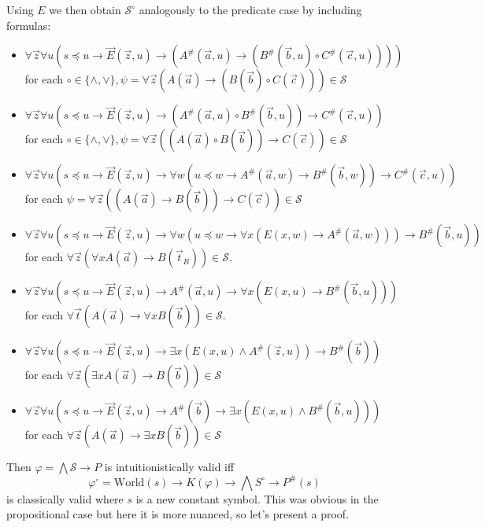 \documentclass[a4paper,12pt]{report}
\theoremstyle{definition}
\theoremstyle{definition}
\theoremstyle{definition}
\theoremstyle{definition}
\theoremstyle{definition}
\theoremstyle{definition}
\theoremstyle{definition}
\begin{document}
	Using $E$ we then obtain $\mathcal S^\circ$ analogously to the predicate case by including formulas:
	
	\begin{itemize}
		\item $\forall \vec z\forall u(s\preceq u\to \vec E(\vec z, u)\to (A^\#(\vec a, u)\to (B^\#(\vec b, u)\circ C^\#(\vec c, u))))$\\for each $\circ\in\{\wedge, \vee\}, \psi = \forall \vec z(A(\vec a)\to (B(\vec b)\circ C(\vec c)))\in\mathcal S$
		\item $\forall \vec z\forall u(s\preceq u\to\vec E(\vec z, u)\to (A^\#(\vec a, u)\circ B^\#(\vec b, u))\to C^\#(\vec c, u))$\\for each $\circ\in\{\wedge, \vee\}, \psi = \forall \vec z((A(\vec a)\circ B(\vec b))\to C(\vec c))\in\mathcal S$
		\item $\forall \vec z\forall u(s\preceq u\to\vec E(\vec z, u)\to\forall w(u\preceq w\to A^\#(\vec a, w)\to B^\#(\vec b, w))\to C^\#(\vec c, u))$\\ for each $\psi = \forall \vec z((A(\vec a)\to B(\vec b))\to C(\vec c))\in\mathcal S$
		\item  $\forall \vec z\forall u(s\preceq u\to\vec E(\vec z, u)\to \forall w(u\preceq w\to \forall x(E(x, w)\to A^\#(\vec a, w)))\to B^\#(\vec b, u))$\\for each $\forall \vec z(\forall xA(\vec a)\to B(\vec t_B))\in\mathcal S$.
		\item $\forall \vec z\forall u(s\preceq u\to\vec E(\vec z, u)\to A^\#(\vec a, u)\to \forall x(E(x, u)\to B^\#(\vec b, u)))$\\for each $\forall \vec t(A(\vec a)\to \forall xB(\vec b))\in\mathcal S$.
		\item $\forall \vec z\forall u(s\preceq u\to\vec E(\vec z, u)\to \exists x(E(x, u)\wedge A^\#(\vec z, u))\to B^\#(\vec b))$\\for each $\forall \vec z(\exists xA(\vec a)\to B(\vec b))\in\mathcal S$
		\item $\forall \vec z\forall u(s\preceq u\to\vec E(\vec z, u)\to A^\#(\vec b)\to \exists x(E(x, u)\wedge B^\#(\vec b, u)))$\\for each $\forall \vec z(A(\vec a)\to \exists xB(\vec b))\in\mathcal S$
	\end{itemize}
	
	Then $\varphi = \bigwedge\mathcal S\to P$ is intuitionistically valid iff
	$$\varphi^\circ= \text{World}(s)\to K(\varphi)\to \bigwedge S^\circ\to P^\#(s)$$
	is classically valid where $s$ is a new constant symbol. This was obvious in the propositional case but here it is more nuanced, so let's present a proof.
	
\end{document}
